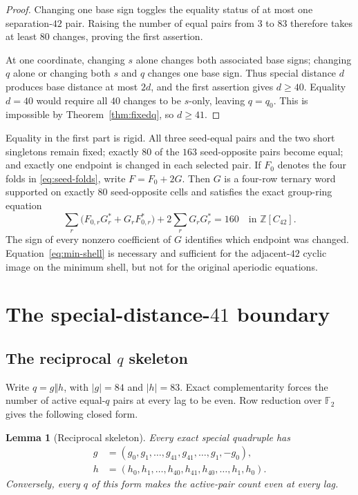 \documentclass[11pt]{article}
\newtheorem{lemma}[theorem]{Lemma}
\theoremstyle{remark}
\newcommand{\Z}{\mathbb Z}
\newcommand{\F}{\mathbb F}
\begin{document}
\begin{proof}
Changing one base sign toggles the equality status of at most one
separation-$42$ pair.  Raising the number of equal pairs from $3$ to $83$
therefore takes at least $80$ changes, proving the first assertion.

At one coordinate, changing $s$ alone changes both associated base signs;
changing $q$ alone or changing both $s$ and $q$ changes one base sign.
Thus special distance $d$ produces base distance at most $2d$, and the
first assertion gives $d\geq40$.  Equality $d=40$ would require all
$40$ changes to be $s$-only, leaving $q=q_0$.  This is impossible by
Theorem~\ref{thm:fixedq}, so $d\geq41$.
\end{proof}

Equality in the first part is rigid.  All three seed-equal pairs and the
two short singletons remain fixed; exactly $80$ of the $163$ seed-opposite
pairs become equal; and exactly one endpoint is changed in each selected
pair.  If $F_0$ denotes the four folds in \eqref{eq:seed-folds}, write
$F=F_0+2G$.  Then $G$ is a four-row ternary word supported on exactly
$80$ seed-opposite cells and satisfies the exact group-ring equation
\begin{equation}
 \sum_r\bigl(F_{0,r}G_r^*+G_rF_{0,r}^*\bigr)
 +2\sum_r G_rG_r^*=160
 \quad\text{in }\Z[C_{42}].                         \label{eq:min-shell}
\end{equation}
The sign of every nonzero coefficient of $G$ identifies which endpoint
was changed.  Equation~\eqref{eq:min-shell} is necessary and sufficient
for the adjacent-$42$ cyclic image on the minimum shell, but not for the
original aperiodic equations.

\section{The special-distance-\texorpdfstring{$41$}{41} boundary}
\label{sec:boundary}

\subsection{The reciprocal \texorpdfstring{$q$}{q} skeleton}

Write $q=g\Vert h$, with $|g|=84$ and $|h|=83$.  Exact
complementarity forces the number of active equal-$q$ pairs at every lag to
be even.  Row reduction over $\F_2$ gives the following closed form.

\begin{lemma}[Reciprocal skeleton]\label{lem:skeleton}
Every exact special quadruple has
\begin{align}
 g&=(g_0,g_1,\ldots,g_{41},g_{41},\ldots,g_1,-g_0),\nonumber\\
 h&=(h_0,h_1,\ldots,h_{40},h_{41},h_{40},\ldots,h_1,h_0).
                                                               \label{eq:skeleton}
\end{align}
Conversely, every $q$ of this form makes the active-pair count even at
every lag.
\end{lemma}
\end{document}
